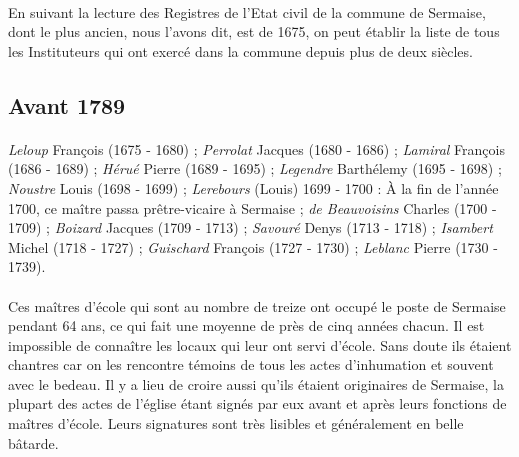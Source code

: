\documentclass[../eBook.tex]{subfiles}
\begin{document}
    \paragraph{}En suivant la lecture des Registres de l'Etat civil de la commune de Sermaise, dont le plus ancien, nous l'avons dit, est de 1675, on peut établir la liste de tous les Instituteurs qui ont exercé dans la commune depuis plus de deux siècles.

    \subsection*{Avant 1789}
      \paragraph{}\textit{Leloup} François (1675 - 1680) ; \textit{Perrolat} Jacques (1680 - 1686) ; \textit{Lamiral} François (1686 - 1689) ; \textit{Hérué} Pierre (1689 - 1695) ; \textit{Legendre} Barthélemy (1695 - 1698) ; \textit{Noustre} Louis (1698 - 1699) ; \textit{Lerebours} (Louis) 1699 - 1700 : À la fin de l'année 1700, ce maître passa prêtre-vicaire à Sermaise ; \textit{de Beauvoisins} Charles (1700 - 1709) ; \textit{Boizard} Jacques (1709 - 1713) ; \textit{Savouré} Denys (1713 - 1718) ; \textit{Isambert} Michel (1718 - 1727) ; \textit{Guischard} François (1727 - 1730) ; \textit{Leblanc} Pierre (1730 - 1739).
      \paragraph{}Ces maîtres d'école qui sont au nombre de treize ont occupé le poste de Sermaise pendant 64 ans, ce qui fait une moyenne de près de cinq années chacun. Il est impossible de connaître les locaux qui leur ont servi d'école. Sans doute ils étaient chantres car on les rencontre témoins de tous les actes d'inhumation et souvent avec le bedeau. Il y a lieu de croire aussi qu'ils étaient originaires de Sermaise, la plupart des actes de l'église étant signés par eux avant et après leurs fonctions de maîtres d'école. Leurs signatures sont très lisibles et généralement en belle bâtarde.
\end{document}
